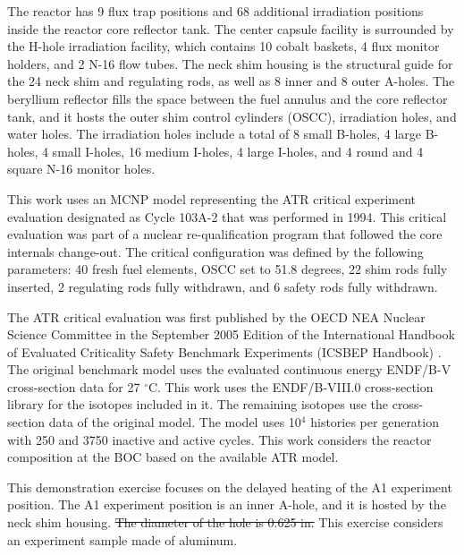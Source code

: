 \documentclass{style/nseJournal}
\providecommand{\DIFadd}[1]{{\protect\color{blue}\uwave{#1}}} %
\providecommand{\DIFdel}[1]{{\protect\color{red}\sout{#1}}}                      %
\providecommand{\DIFaddbegin}{} %
\providecommand{\DIFaddend}{} %
\providecommand{\DIFdelbegin}{} %
\providecommand{\DIFdelend}{} %
\begin{document}
The reactor has 9 flux trap positions and 68 additional irradiation positions inside the reactor core reflector tank.
The center capsule facility is surrounded by the H-hole irradiation facility, which contains 10 cobalt baskets, 4 flux monitor holders, and 2 N-16 flow tubes.
The neck shim housing is the structural guide for the 24 neck shim and regulating rods, as well as 8 inner and 8 outer A-holes.
The beryllium reflector fills the space between the fuel annulus and the core reflector tank, and it hosts the outer shim control cylinders (OSCC), irradiation holes, and water holes.
The irradiation holes include a total of 8 small B-holes, 4 large B-holes, 4 small I-holes, 16 medium I-holes, 4 large I-holes, and 4 round and 4 square N-16 monitor holes.

This work uses an MCNP model representing the ATR critical experiment evaluation designated as Cycle 103A-2 that was performed in 1994.
This critical evaluation was part of a nuclear re-qualification program that followed the core internals change-out.
The critical configuration was defined by the following parameters: 40 fresh fuel elements, OSCC set to 51.8 degrees, 22 shim rods fully inserted, 2 regulating rods fully withdrawn, and 6 safety rods fully withdrawn.

The ATR critical evaluation was first published by the OECD NEA Nuclear Science Committee in the September 2005 Edition of the International Handbook of Evaluated Criticality Safety Benchmark Experiments (ICSBEP Handbook) \cite{ICSBEP}.
The original benchmark model uses the evaluated continuous energy ENDF/B-V cross-section data for 27 $^{\circ}$C.
This work uses the ENDF/B-VIII.0 cross-section library for the isotopes included in it.
The remaining isotopes use the cross-section data of the original model.
The model uses 10$^4$ histories per generation with 250 and 3750 inactive and active cycles.
This work considers the reactor composition at the \gls*{BOC} based on the available ATR model.

This demonstration exercise focuses on the delayed heating of the A1 experiment position.
The A1 experiment position is an inner A-hole, and it is hosted by the neck shim housing.
\DIFdelbegin \DIFdel{The diameter of the hole is 0.625 in.
}\DIFdelend This exercise considers an experiment sample \DIFaddbegin \DIFadd{of 1.46 cm in diameter and 168.27 cm in height }\DIFaddend made of aluminum.
\end{document}

